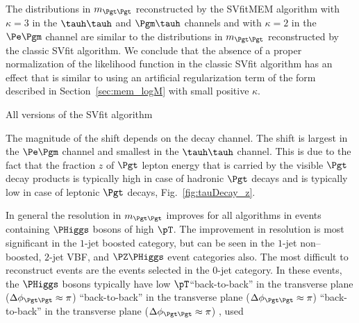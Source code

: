 {{{{The distributions in $m_{\Pgt\Pgt}$ reconstructed by the SVfitMEM
algorithm with $\kappa = 3$ in the $\tauh\tauh$ and $\Pgm\tauh$ channels and with $\kappa = 2$ in the $\Pe\Pgm$ channel
are similar to the distributions in $m_{\Pgt\Pgt}$ reconstructed by the classic SVfit algorithm.
We conclude that the absence of a proper normalization of the likelihood function in the classic SVfit algorithm
has an effect that is similar to using an artificial regularization term of the form described in Section~\ref{sec:mem_logM} with small positive $\kappa$.




All versions of the SVfit algorithm

The magnitude of the shift depends on the decay channel.
The shift is largest in the $\Pe\Pgm$ channel and smallest in the $\tauh\tauh$ channel.
This is due to the fact that the fraction $z$ of $\Pgt$ lepton energy that is carried by the visible $\Pgt$ decay products
is typically high in case of hadronic $\Pgt$ decays and is typically low in case of leptonic $\Pgt$ decays,
\cf Fig.~\ref{fig:tauDecay_z}.


In general the resolution in $m_{\Pgt\Pgt}$ improves for all algorithms in events containing $\PHiggs$ bosons of high $\pT$.
The improvement in resolution is most significant in the $1$-jet boosted category, but can be seen in the $1$-jet non--boosted, $2$-jet VBF, and $\PZ\PHiggs$ event categories also.
The most difficult to reconstruct events are the events selected in the $0$-jet category.
In these events, the $\PHiggs$ bosons typically have low $\pT$``back-to-back'' in the transverse plane ($\Delta\phi_{\Pgt\Pgt} \approx \pi$) ``back-to-back'' in the transverse plane ($\Delta\phi_{\Pgt\Pgt} \approx \pi$) ``back-to-back'' in the transverse plane ($\Delta\phi_{\Pgt\Pgt} \approx \pi$) 
,
used 



}}}}
